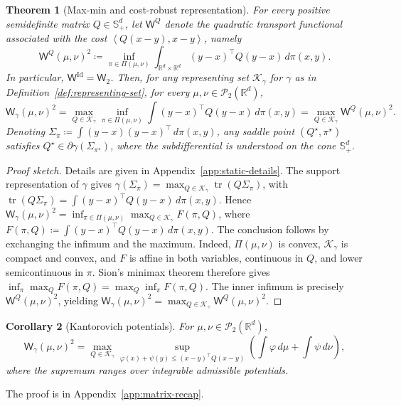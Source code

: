 \documentclass{article}
\newtheorem{theorem}{Theorem}[section]
\newtheorem{corollary}[theorem]{Corollary}
\newenvironment{proofsketch}{\begin{proof}[Proof sketch]}{\end{proof}}
\newcommand{\R}{\mathbb{R}}
\newcommand{\cP}{\mathcal{P}}
\newcommand{\Wtwo}{\mathsf{W}_2}
\newcommand{\Wg}{\mathsf{W}_{\gamma}}
\newcommand{\WQ}[1]{\mathsf{W}^{#1}}
\newcommand{\tr}{\operatorname{tr}}
\newcommand{\Id}{\mathrm{Id}}
\newcommand{\ip}[2]{\left\langle #1,#2 \right\rangle}
\newcommand{\cK}{\mathcal K_\gamma}
\begin{document}
\begin{theorem}[Max-min and cost-robust representation]
\label{thm:minmax}
For every positive semidefinite matrix
$Q\in\mathbb S_+^d$, let $\WQ{Q}$ denote the quadratic transport functional
associated with the cost $\ip{Q(x-y)}{x-y}$, namely
\[
    \WQ{Q}(\mu,\nu)^2
    \coloneqq
    \inf_{\pi\in\Pi(\mu,\nu)}
    \int_{\R^d\times\R^d} (y-x)^\top Q (y-x)\,d\pi(x,y).
\]
In particular, $\WQ{\Id}=\Wtwo$. 
%
Then, for any representing set $\cK$ for $\gamma$ as in
Definition~\ref{def:representing-set}, for every $\mu,\nu\in\cP_2(\R^d)$,
$$
\Wg(\mu,\nu)^2
=
\max_{Q\in\cK}
\inf_{\pi\in\Pi(\mu,\nu)}
\int (y-x)^\top Q (y-x)\,d\pi(x,y)
=
\max_{Q\in\cK}\WQ{Q}(\mu,\nu)^2.
$$ 
Denoting
$\Sigma_\pi\coloneqq\int (y-x)(y-x)^\top\,d\pi(x,y)$, any saddle point
$(Q^\star,\pi^\star)$ satisfies
$Q^\star\in\partial\gamma(\Sigma_{\pi^\star})$, where the subdifferential is
understood on the cone $\mathbb S_+^d$.
\end{theorem}

\begin{proofsketch}
Details are given in Appendix~\ref{app:static-details}. 
The support
representation of $\gamma$ gives
$\gamma(\Sigma_\pi)=\max_{Q\in\cK}\tr(Q\Sigma_\pi)$, with
$\tr(Q\Sigma_\pi)=\int (y-x)^\top Q(y-x)\,d\pi(x,y)$. Hence
$\Wg(\mu,\nu)^2=\inf_{\pi\in\Pi(\mu,\nu)}\max_{Q\in\cK}F(\pi,Q)$, where
$F(\pi,Q)\coloneqq\int (y-x)^\top Q(y-x)\,d\pi(x,y)$.
%
The conclusion follows by exchanging the infimum and the maximum. Indeed,
$\Pi(\mu,\nu)$ is convex, $\cK$ is compact and convex, and $F$ is affine in both
variables, continuous in $Q$, and lower semicontinuous in $\pi$. Sion's minimax
theorem therefore gives
$\inf_{\pi}\max_{Q}F(\pi,Q)=\max_{Q}\inf_{\pi}F(\pi,Q)$. The inner infimum is
precisely $\WQ{Q}(\mu,\nu)^2$, yielding
$\Wg(\mu,\nu)^2=\max_{Q\in\cK}\WQ{Q}(\mu,\nu)^2$.
\end{proofsketch}



\begin{corollary}[Kantorovich potentials]\label{cor:kantorovich-potentials}
For $\mu,\nu\in\cP_2(\R^d)$,
\[
 \Wg(\mu,\nu)^2
 =\max_{Q\in\cK}
   \sup_{\varphi(x)+\psi(y)\le (x-y)^\top Q(x-y)}
   \left(\int\varphi\,d\mu+\int\psi\,d\nu\right),
\]
where the supremum ranges over integrable admissible potentials.
\end{corollary}
The proof is in Appendix~\ref{app:matrix-recap}.
\end{document}
